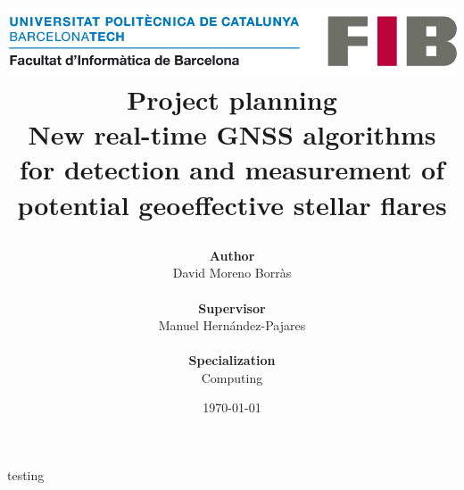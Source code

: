 \documentclass[12pt]{article}
\title{
	{
	\includegraphics[width=0.7\linewidth]{images/logo-fib.png}	
	\vspace{1cm}
	\textbf{\\Project planning} \\
	\large New real-time GNSS algorithms for detection and measurement of potential geoeffective stellar flares}
\author{\textbf{Author}\\
	David Moreno Borr\`as
	\\ \\
	\textbf{Supervisor}\\
	 Manuel Hernández-Pajares
	 \\ \\
	\textbf{Specialization}\\
	Computing
} 
	\vspace{1.3cm}
\date{\today}
}
\begin{document}
	
\clearpage
\maketitle
\thispagestyle{empty}
\clearpage
\tableofcontents
\thispagestyle{empty}
\clearpage



testing \cite{hernandez2009igs} \cite{martinez2016first}
\cite{swiftnasa}

\newpage


\end{document}

